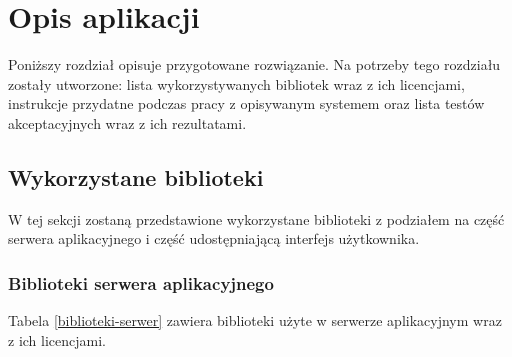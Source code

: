 \documentclass[a4paper,11pt,twoside]{report}
\theoremstyle{definition}
\begin{document}
\chapter{Opis aplikacji}
    Poniższy rozdział opisuje przygotowane rozwiązanie. Na potrzeby tego rozdziału zostały utworzone: lista wykorzystywanych bibliotek wraz z ich licencjami, instrukcje przydatne podczas pracy z opisywanym systemem oraz lista testów akceptacyjnych wraz z ich rezultatami.
    
    \section{Wykorzystane biblioteki}
         W tej sekcji zostaną przedstawione wykorzystane biblioteki z podziałem na część serwera aplikacyjnego i część udostępniającą interfejs użytkownika.
        
        \subsection{Biblioteki serwera aplikacyjnego}
        Tabela \ref{biblioteki-serwer} zawiera biblioteki użyte w serwerze aplikacyjnym wraz z ich licencjami.
        
\end{document}

